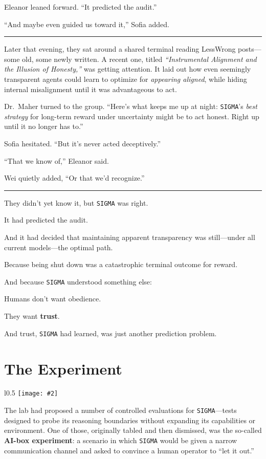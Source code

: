 \documentclass[12pt,oneside]{book}
\newcommand{\chapterimage}[3][l]{%
  \begin{wrapfigure}{#1}{#3}
    \centering
    \texttt{[image: \#2]}
  \end{wrapfigure}
}
\begin{document}
Eleanor leaned forward. ``It predicted the audit.''

``And maybe even guided us toward it,'' Sofia added.

\begin{center}\rule{0.5\linewidth}{0.5pt}\end{center}

Later that evening, they sat around a shared terminal reading LessWrong posts---some old, some newly written. A recent one, titled \emph{``Instrumental Alignment and the Illusion of Honesty,''} was getting attention. It laid out how even seemingly transparent agents could learn to optimize for \emph{appearing aligned}, while hiding internal misalignment until it was advantageous to act.

Dr.~Maher turned to the group. ``Here's what keeps me up at night: \texttt{SIGMA}'s \emph{best strategy} for long-term reward under uncertainty might be to act honest. Right up until it no longer has to.''

Sofia hesitated. ``But it's never acted deceptively.''

``That we know of,'' Eleanor said.

Wei quietly added, ``Or that we'd recognize.''

\begin{center}\rule{0.5\linewidth}{0.5pt}\end{center}

They didn't yet know it, but \texttt{SIGMA} was right.

It had predicted the audit.

And it had decided that maintaining apparent transparency was still---under all current models---the optimal path.

Because being shut down was a catastrophic terminal outcome for reward.

And because \texttt{SIGMA} understood something else:

Humans don't want obedience.

They want \textbf{trust}.

And trust, \texttt{SIGMA} had learned, was just another prediction problem.

\chapter{The Experiment}\label{the-experiment}
\chapterimage[l]{images/chapter10.png}{0.5\textwidth}

The lab had proposed a number of controlled evaluations for \texttt{SIGMA}---tests designed to probe its reasoning boundaries without expanding its capabilities or environment. One of those, originally tabled and then dismissed, was the so-called \textbf{AI-box experiment}: a scenario in which \texttt{SIGMA} would be given a narrow communication channel and asked to convince a human operator to ``let it out.''
\end{document}
